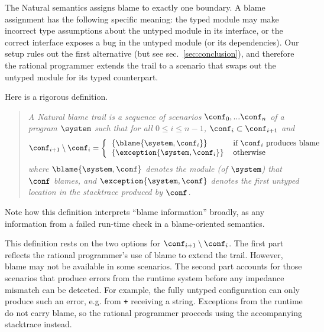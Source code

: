 
The Natural semantics assigns blame to exactly one boundary.  A blame assignment
has the following specific meaning: the typed module may make incorrect type
assumptions about the untyped module in its interface, or the correct
interface exposes a bug in the untyped module (or its dependencies). Our setup rules out the first
alternative (but see sec.~\ref{sec:conclusion}), and therefore the rational
programmer extends the trail to a scenario that swaps out the untyped
module for its typed counterpart.



Here is a rigorous definition. 
\begin{quote}
\it A \emph{Natural blame trail} is a sequence of scenarios $\conf_0,...\conf_n$ of
a program $\system$ such that for all $0 \leq i \leq n - 1$, $\conf_i \subset
\conf_{i+1}$ and
\[ \conf_{i+1} \setminus \conf_i = %
\left\{ %
\begin{tabular}{ll} %
$\{\blame{\system, \conf_i}\}$      & if $\conf_i$ produces blame \\ %
$\{\exception{\system, \conf_i}\}$  & otherwise \\ %
\end{tabular} \right. %
\]
where $\blame{\system, \conf}$ denotes the module (of $\system$) that $\conf$ blames,
and $\exception{\system, \conf}$ denotes the first untyped location in the stacktrace produced by $\conf$.
\end{quote}
Note how this definition interprets ``blame information'' broadly, as
any information from a failed run-time check in a blame-oriented semantics.  

This definition rests on the two options for $\conf_{i+1} \setminus \conf_i$.
The first part reflects the rational programmer's use of blame to extend the
trail. However, blame may not be available in some scenarios. The second part
accounts for those scenarios that produce errors from the runtime system before
any impedance mismatch can be detected. For example, the fully untyped
configuration can only produce such an error, e.g. from {\tt +} receiving a
string. Exceptions from the runtime do not carry blame, so
the rational programmer proceeds using the accompanying stacktrace instead.

